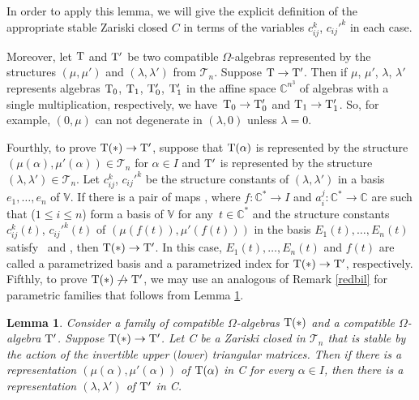 \documentclass[pdftex]{sigma}
\numberwithin{equation}{section}
\newtheorem{Lemma}[Theorem]{Lemma}
\begin{document}
In order to apply this lemma, we will give the explicit definition of the appropriate stable Zariski closed $C$ in terms of the variables $c_{ij}^k$, $c_{ij}'^k$ in each case.

\begin{Remark}\label{redbil}
Moreover, let ${{\rm T} }$ and ${{\rm T} }'$ be two compatible $\Omega$-algebras represented by the structures $(\mu, \mu')$ and $(\lambda, \lambda')$ from ${\mathcal{T}_{n}}$. Suppose ${\rm T}\to{\rm T}'$. Then if $\mu$, $\mu'$, $\lambda$, $\lambda'$ represents algebras ${\rm T}_{0}$, ${\rm T}_{1}$, ${\rm T}'_{0}$, ${\rm T}'_{1}$ in the affine space $\mathbb{C}^{n^3}$ of algebras with a single multiplication, respectively, we have~${{\rm T}_{0}\to {\rm T}'_{0}}$ and $ {\rm T}_{1}\to {\rm T}'_{1}$.
So, for example, $(0, \mu)$ can not degenerate in $(\lambda, 0)$ unless $\lambda=0$.
\end{Remark}

Fourthly, to prove ${{\rm T} }(*)\to {{\rm T} }'$, suppose that ${{\rm T} }(\alpha)$ is represented by the structure $(\mu(\alpha),\mu'(\alpha))\allowbreak\in{\mathcal{T} }_n$ for $\alpha\in I$ and ${{\rm T} }'$ is represented by the structure $(\lambda, \lambda')\in{\mathcal{T} }_n$. Let $c_{ij}^k$, $c_{ij}'^k$ be the structure constants of $(\lambda, \lambda')$ in a basis $e_1,\dots, e_n$ of ${\mathbb V}$. If there is a pair of maps , where $f\colon \mathbb{C}^*\to I$ and $a_i^j\colon\mathbb{C}^*\to \mathbb{C}$ are such that  ($1\le i\le n$) form a basis of ${\mathbb V}$ for any~${t\in\mathbb{C}^*}$ and the structure constants $c_{ij}^k(t)$, $c_{ij}'^k(t)$ of $(\mu(f(t)),\mu'(f(t)))$ in the basis $E_1(t),\dots, E_n(t)$ satisfy~ and , then ${{\rm T} }(*)\to {{\rm T} }'$. In this case, $E_1(t),\dots, E_n(t)$ and $f(t)$ are called a parametrized basis and a parametrized index for ${{\rm T} }(*)\to {{\rm T} }'$, respectively.
Fifthly, to prove ${{\rm T} }(*)\not \to {{\rm T} }'$, we may use an analogous of Remark \ref{redbil} for parametric families that follows from Lemma \ref{main2}.

\begin{Lemma}\label{main2}
Consider a family of compatible $\Omega$-algebras ${\rm T}(*)$ and a compatible $\Omega$-algebra ${\rm T}'$. Suppose ${\rm T}(*) \to {\rm T}'$. Let C be a Zariski closed in $\mathcal{T}_n$ that is stable by the action of the invertible upper $($lower$)$ triangular matrices. Then if there is a representation $(\mu(\alpha), \mu'(\alpha))$ of ${\rm T}(\alpha)$ in C for every $\alpha\in I$, then there is a representation $(\lambda, \lambda')$ of ${\rm T}'$ in C.
\end{Lemma}
\end{document}
